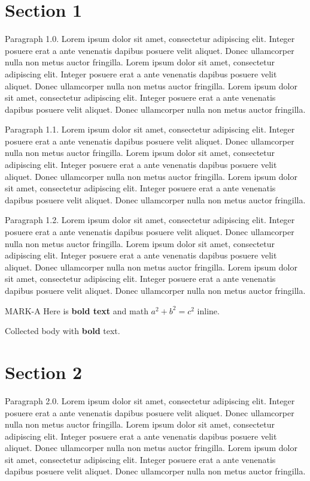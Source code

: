 \documentclass{article}
\begin{document}
\section{Section 1}
Paragraph 1.0. Lorem ipsum dolor sit amet, consectetur adipiscing elit. Integer posuere erat a ante venenatis dapibus posuere velit aliquet. Donec ullamcorper nulla non metus auctor fringilla. Lorem ipsum dolor sit amet, consectetur adipiscing elit. Integer posuere erat a ante venenatis dapibus posuere velit aliquet. Donec ullamcorper nulla non metus auctor fringilla. Lorem ipsum dolor sit amet, consectetur adipiscing elit. Integer posuere erat a ante venenatis dapibus posuere velit aliquet. Donec ullamcorper nulla non metus auctor fringilla. 

Paragraph 1.1. Lorem ipsum dolor sit amet, consectetur adipiscing elit. Integer posuere erat a ante venenatis dapibus posuere velit aliquet. Donec ullamcorper nulla non metus auctor fringilla. Lorem ipsum dolor sit amet, consectetur adipiscing elit. Integer posuere erat a ante venenatis dapibus posuere velit aliquet. Donec ullamcorper nulla non metus auctor fringilla. Lorem ipsum dolor sit amet, consectetur adipiscing elit. Integer posuere erat a ante venenatis dapibus posuere velit aliquet. Donec ullamcorper nulla non metus auctor fringilla. 

Paragraph 1.2. Lorem ipsum dolor sit amet, consectetur adipiscing elit. Integer posuere erat a ante venenatis dapibus posuere velit aliquet. Donec ullamcorper nulla non metus auctor fringilla. Lorem ipsum dolor sit amet, consectetur adipiscing elit. Integer posuere erat a ante venenatis dapibus posuere velit aliquet. Donec ullamcorper nulla non metus auctor fringilla. Lorem ipsum dolor sit amet, consectetur adipiscing elit. Integer posuere erat a ante venenatis dapibus posuere velit aliquet. Donec ullamcorper nulla non metus auctor fringilla. 

MARK-A Here is \textbf{bold text} and math $a^2+b^2=c^2$ inline.

\begin{collect}
Collected body with \textbf{bold} text.
\end{collect}

\section{Section 2}
Paragraph 2.0. Lorem ipsum dolor sit amet, consectetur adipiscing elit. Integer posuere erat a ante venenatis dapibus posuere velit aliquet. Donec ullamcorper nulla non metus auctor fringilla. Lorem ipsum dolor sit amet, consectetur adipiscing elit. Integer posuere erat a ante venenatis dapibus posuere velit aliquet. Donec ullamcorper nulla non metus auctor fringilla. Lorem ipsum dolor sit amet, consectetur adipiscing elit. Integer posuere erat a ante venenatis dapibus posuere velit aliquet. Donec ullamcorper nulla non metus auctor fringilla. 
\end{document}
